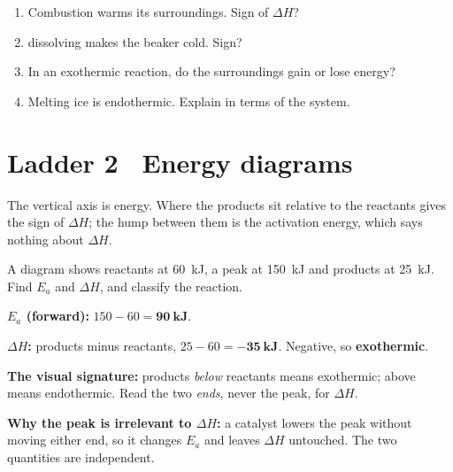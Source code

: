 \documentclass{apchem-worksheet}
\begin{document}
\begin{yourturn}
\begin{enumerate}[leftmargin=*,itemsep=0.5em]
  \item Combustion warms its surroundings. Sign of $\Delta H$?
        \workspace[1.4cm]
  \item {} dissolving makes the beaker cold. Sign?
        \workspace[1.4cm]
  \item In an exothermic reaction, do the surroundings gain or lose
        energy? \workspace[1.4cm]
  \item Melting ice is endothermic. Explain in terms of the system.
        \workspace[1.8cm]
\end{enumerate}
\end{yourturn}

\section*{\sffamily Ladder 2 \textbullet\ Energy diagrams}

The vertical axis is energy. Where the products sit relative to the
reactants gives the sign of $\Delta H$; the hump between them is the
activation energy, which says nothing about $\Delta H$.

\begin{workedexample}
A diagram shows reactants at \SI{60}{\kilo\joule}, a peak at
\SI{150}{\kilo\joule} and products at \SI{25}{\kilo\joule}. Find $E_a$
and $\Delta H$, and classify the reaction.

\textbf{$E_a$ (forward):} $150 - 60 = \mathbf{90~kJ}$.

\textbf{$\Delta H$:} products minus reactants, $25 - 60 =
\mathbf{-35~kJ}$. Negative, so \textbf{exothermic}.

\textbf{The visual signature:} products \emph{below} reactants means
exothermic; above means endothermic. Read the two \emph{ends}, never the
peak, for $\Delta H$.

\textbf{Why the peak is irrelevant to $\Delta H$:} a catalyst lowers the
peak without moving either end, so it changes $E_a$ and leaves $\Delta H$
untouched. The two quantities are independent.
\end{workedexample}
\end{document}
